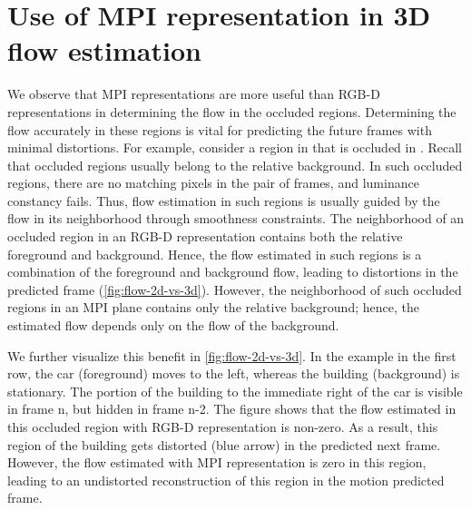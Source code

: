 \documentclass[preprint]{vgtc}
\begin{document}
    \section{Use of MPI representation in 3D flow estimation}\label{sec:mpi-flow-estimation}
    We observe that MPI representations are more useful than RGB-D representations in determining the flow in the occluded regions.
    Determining the flow accurately in these regions is vital for predicting the future frames with minimal distortions.
    For example, consider a region in  that is occluded in .
    Recall that occluded regions usually belong to the relative background.
    In such occluded regions, there are no matching pixels in the pair of frames, and luminance constancy fails.
    Thus, flow estimation in such regions is usually guided by the flow in its neighborhood through smoothness constraints.
    The neighborhood of an occluded region in an RGB-D representation contains both the relative foreground and background.
    Hence, the flow estimated in such regions is a combination of the foreground and background flow, leading to distortions in the predicted frame (\autoref{fig:flow-2d-vs-3d}).
    However, the neighborhood of such occluded regions in an MPI plane contains only the relative background;
    hence, the estimated flow depends only on the flow of the background.

    We further visualize this benefit in \autoref{fig:flow-2d-vs-3d}.
    In the example in the first row, the car (foreground) moves to the left, whereas the building (background) is stationary.
    The portion of the building to the immediate right of the car is visible in frame n, but hidden in frame n-2.
    The figure shows that the flow estimated in this occluded region with RGB-D representation is non-zero.
    As a result, this region of the building gets distorted (blue arrow) in the predicted next frame.
    However, the flow estimated with MPI representation is zero in this region, leading to an undistorted reconstruction of this region in the motion predicted frame.
\end{document}
